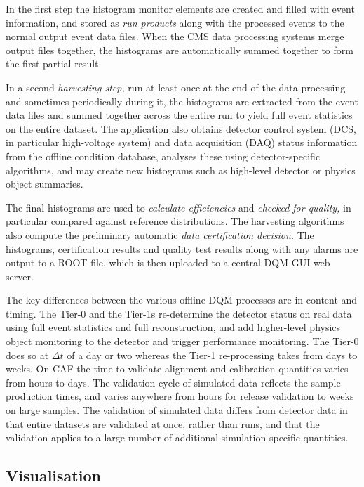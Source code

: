 \documentclass[a4paper]{jpconf}
\begin{document}
In the first step the histogram monitor elements are created and filled with
event information, and stored as {\em run products} along with the processed
events to the normal output event data files.  When the CMS data processing
systems merge output files together, the histograms are automatically summed
together to form the first partial result.

In a second {\em harvesting step,} run at least once at the end of the data
processing and sometimes periodically during it, the histograms are extracted
from the event data files and summed together across the entire run to yield
full event statistics on the entire dataset.  The application also obtains
detector control system (DCS, in particular high-voltage system) and data
acquisition (DAQ) status information from the offline condition database,
analyses these using detector-specific algorithms, and may create new
histograms such as high-level detector or physics object summaries.

The final histograms are used to {\em calculate efficiencies} and {\em checked
  for quality,} in particular compared against reference distributions.  The
harvesting algorithms also compute the preliminary automatic {\em data
  certification decision.}  The histograms, certification results and quality
test results along with any alarms are output to a ROOT file, which is then
uploaded to a central DQM GUI web server.

The key differences between the various offline DQM processes are in content
and timing.  The Tier-0 and the Tier-1s re-determine the detector status on
real data using full event statistics and full reconstruction, and add
higher-level physics object monitoring to the detector and trigger performance
monitoring.  The Tier-0 does so at $\Delta t$ of a day or two whereas the
Tier-1 re-processing takes from days to weeks.  On CAF the time to validate
alignment and calibration quantities varies from hours to days.  The
validation cycle of simulated data reflects the sample production times, and
varies anywhere from hours for release validation to weeks on large samples.
The validation of simulated data differs from detector data in that entire
datasets are validated at once, rather than runs, and that the validation
applies to a large number of additional simulation-specific quantities.

\subsection{Visualisation}
\end{document}
